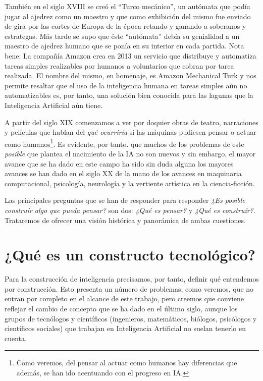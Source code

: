 \documentclass[12pt]{memoir}
\begin{document}
También en el siglo XVIII se creó el ``Turco mecánico'', un autómata que podía jugar al ajedrez como un maestro y que como exhibición del mismo fue enviado de gira por las cortes de Europa de la época retando y ganando a soberanos y estrategas. Más tarde se supo que éste ``autómata'' debía su genialidad a un maestro de ajedrez humano que se ponía en su interior en cada partida. Nota bene: La compañía Amazon crea en 2013 un servicio que distribuye y automatiza tareas simples realizables por humanos a voluntarios que cobran por tarea realizada. El nombre del mismo, en homenaje, es Amazon Mechanical Turk y nos permite resaltar que el uso de la inteligencia humana en tareas simples aún no automatizables es, por tanto, una solución bien conocida para las lagunas que la Inteligencia Artificial aún tiene. 

A partir del siglo XIX comenzamos a ver por doquier obras de teatro, narraciones y películas que hablan del \textit{qué ocurriría} si las máquinas pudiesen pensar o actuar como humanos\footnote{Como veremos, del pensar al actuar como humanos hay diferencias que además, se han ido acentuando con el progreso en IA.}. Es evidente, por tanto. que muchos de los problemas de este \textit{posible} que plantea el nacimiento de la IA no son nuevos y sin embargo, el mayor avance que se ha dado en este campo ha sido sin duda alguna los mayores avances se han dado en el siglo XX de la mano de los avances en maquinaria computacional, psicología, neurología y la vertiente artística en la ciencia-ficción.

Las principales preguntas que se han de responder para responder \textit{¿Es posible construír algo que pueda pensar?} son dos: \textit{¿Qué es pensar?} y \textit{¿Qué es construír?}. Trataremos de ofrecer una visión histórica y panorámica de ambas cuestiones.

\section{¿Qué es un constructo tecnológico?}

Para la construcción de inteligencia precisamos, por tanto, definir qué entendemos por construcción. Esto presenta un número de problemas, como veremos, que no entran por completo en el alcance de este trabajo, pero creemos que conviene reflejar el cambio de concepto que se ha dado en el último siglo, aunque los grupos de tecnólogos y científicos (ingenieros, matemáticos, biólogos, psicólogos y científicos sociales) que trabajan en Inteligencia Artificial no suelan tenerlo en cuenta.
\end{document}
